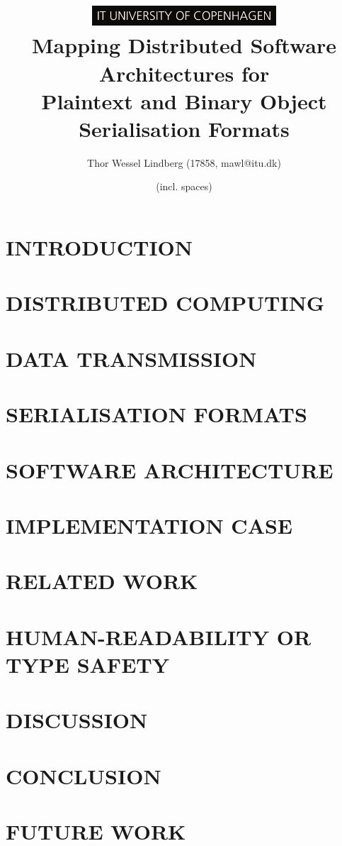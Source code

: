 \documentclass[10pt, twocolumn, letterpaper]{article}
\title{
    \includegraphics[height=0.75cm]{logo.jpg} \\
    \vspace{1.25cm}
    \Large \textbf{Mapping Distributed Software Architectures for}  \\
    \Large \textbf{Plaintext and Binary Object Serialisation Formats}  \\
}
\author{Thor Wessel Lindberg (17858, mawl@itu.dk)}
\date{\charactercount{report} (incl. spaces)}
\begin{document}
\maketitle



\section{INTRODUCTION}


\section{DISTRIBUTED COMPUTING} %


\section{DATA TRANSMISSION} %


\section{SERIALISATION FORMATS} %


\section{SOFTWARE ARCHITECTURE} %


\section{IMPLEMENTATION CASE} %


\section{RELATED WORK} %


\section{HUMAN-READABILITY OR TYPE SAFETY} %


\section{DISCUSSION}


\section{CONCLUSION}


\section{FUTURE WORK}



\end{document}
